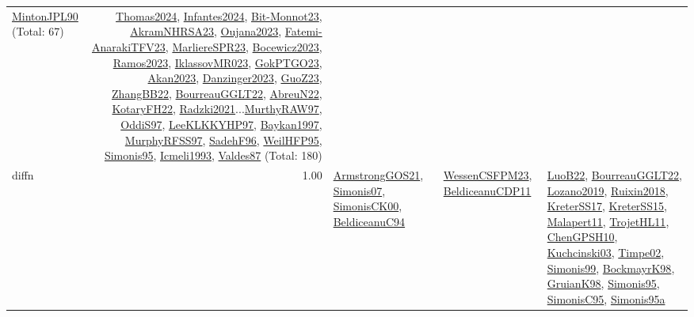 {\begin{longtable}{p{3cm}r>{\raggedright\arraybackslash}p{6cm}>{\raggedright\arraybackslash}p{6cm}>{\raggedright\arraybackslash}p{8cm}}
\hyperref[detail:MintonJPL90]{MintonJPL90} (Total: 67) & \hyperref[detail:Thomas2024]{Thomas2024}, \hyperref[detail:Infantes2024]{Infantes2024}, \hyperref[detail:Bit-Monnot23]{Bit-Monnot23}, \hyperref[detail:AkramNHRSA23]{AkramNHRSA23}, \hyperref[detail:Oujana2023]{Oujana2023}, \hyperref[detail:Fatemi-AnarakiTFV23]{Fatemi-AnarakiTFV23}, \hyperref[detail:MarliereSPR23]{MarliereSPR23}, \hyperref[detail:Bocewicz2023]{Bocewicz2023}, \hyperref[detail:Ramos2023]{Ramos2023}, \hyperref[detail:IklassovMR023]{IklassovMR023}, \hyperref[detail:GokPTGO23]{GokPTGO23}, \hyperref[detail:Akan2023]{Akan2023}, \hyperref[detail:Danzinger2023]{Danzinger2023}, \hyperref[detail:GuoZ23]{GuoZ23}, \hyperref[detail:ZhangBB22]{ZhangBB22}, \hyperref[detail:BourreauGGLT22]{BourreauGGLT22}, \hyperref[detail:AbreuN22]{AbreuN22}, \hyperref[detail:KotaryFH22]{KotaryFH22}, \hyperref[detail:Radzki2021]{Radzki2021}...\hyperref[detail:MurthyRAW97]{MurthyRAW97}, \hyperref[detail:OddiS97]{OddiS97}, \hyperref[detail:LeeKLKKYHP97]{LeeKLKKYHP97}, \hyperref[detail:Baykan1997]{Baykan1997}, \hyperref[detail:MurphyRFSS97]{MurphyRFSS97}, \hyperref[detail:SadehF96]{SadehF96}, \hyperref[detail:WeilHFP95]{WeilHFP95}, \hyperref[detail:Simonis95]{Simonis95}, \hyperref[detail:Icmeli1993]{Icmeli1993}, \hyperref[detail:Valdes87]{Valdes87} (Total: 180)\\
\index{diffn}\index{Constraints!diffn}diffn &  1.00 & \hyperref[detail:ArmstrongGOS21]{ArmstrongGOS21}, \hyperref[detail:Simonis07]{Simonis07}, \hyperref[detail:SimonisCK00]{SimonisCK00}, \hyperref[detail:BeldiceanuC94]{BeldiceanuC94} & \hyperref[detail:WessenCSFPM23]{WessenCSFPM23}, \hyperref[detail:BeldiceanuCDP11]{BeldiceanuCDP11} & \hyperref[detail:LuoB22]{LuoB22}, \hyperref[detail:BourreauGGLT22]{BourreauGGLT22}, \hyperref[detail:Lozano2019]{Lozano2019}, \hyperref[detail:Ruixin2018]{Ruixin2018}, \hyperref[detail:KreterSS17]{KreterSS17}, \hyperref[detail:KreterSS15]{KreterSS15}, \hyperref[detail:Malapert11]{Malapert11}, \hyperref[detail:TrojetHL11]{TrojetHL11}, \hyperref[detail:ChenGPSH10]{ChenGPSH10}, \hyperref[detail:Kuchcinski03]{Kuchcinski03}, \hyperref[detail:Timpe02]{Timpe02}, \hyperref[detail:Simonis99]{Simonis99}, \hyperref[detail:BockmayrK98]{BockmayrK98}, \hyperref[detail:GruianK98]{GruianK98}, \hyperref[detail:Simonis95]{Simonis95}, \hyperref[detail:SimonisC95]{SimonisC95}, \hyperref[detail:Simonis95a]{Simonis95a}\\

\end{longtable}}

